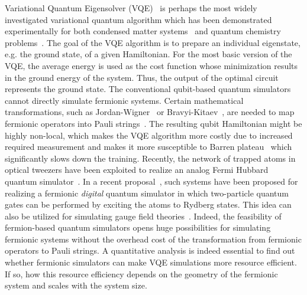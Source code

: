 \documentclass[aps, pra, reprint, superscriptaddress]{revtex4-1}
\begin{document}
Variational Quantum Eigensolver (VQE)~\cite{peruzzo2014variational,wang2019accelerated, wu2021expressivity,tilly2022variational,uvarov2020variational} is perhaps the most widely investigated variational quantum algorithm which has been demonstrated experimentally for both condensed matter systems~\cite{ 
sagastizabal2021variational,kokail2019self,bravo2020scaling} and quantum chemistry problems~\cite{kandala2017hardware,li2019variational,google2020hartree,metcalf2020resource,cai2020quantum,zhang2021shallow, delgado2021variational,yoshikawa2022quantum}. The goal of the VQE algorithm is to prepare an individual eigenstate, e.g. the ground state, of a given Hamiltonian. For the most basic version of the VQE, the average energy is used as the cost function whose minimization results in the ground energy of the system. Thus, the output of the optimal circuit represents the ground state.  The conventional qubit-based quantum simulators cannot directly simulate fermionic systems. Certain mathematical transformations, such as Jordan-Wigner~\cite{jordan1993paulische,lieb1961two,batista2001generalized,derzhko2001jordan} or Bravyi-Kitaev~\cite{bravyi2002fermionic}, are needed to map  fermionic operators into Pauli strings~\cite{stanisic2022observing}. The resulting qubit Hamiltonian might be highly non-local, which makes the VQE algorithm more costly due to increased required measurement and makes it more susceptible to Barren plateau~\cite{mcclean2018barren,wang2021noise,uvarov2021barren,cerezo2021cost} which significantly slows down the training. 
Recently, the network of trapped atoms in optical tweezers have been exploited to realize an analog Fermi Hubbard quantum simulator~\cite{norcia2018microscopic,yan2022two,spar2022realization}. In a recent proposal~\cite{gonzalez2023fermionic}, such systems have been proposed for realizing a fermionic \emph{digital} quantum simulator in which two-particle quantum gates can be performed by exciting the atoms to Rydberg states. This idea can also be utilized for simulating gauge field theories~\cite{gonzalez2022hardware,zache2023fermion}. Indeed, the feasibility of fermion-based quantum simulators opens huge possibilities for simulating fermionic systems without the overhead cost of the transformation from fermionic operators to Pauli strings.
A quantitative analysis is indeed essential to find out whether fermionic simulators can make VQE simulations more resource efficient. If so, how this resource efficiency depends on the geometry of the fermionic system and scales with the system size. 
\end{document}
